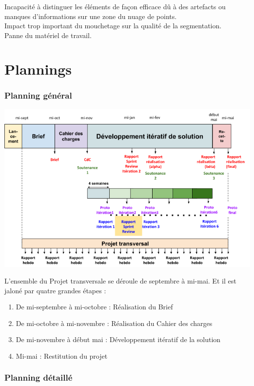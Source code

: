 \documentclass[12pt,titlepage,french]{article}
\begin{document}
Incapacité à distinguer les éléments de façon efficace dû à des artefacts ou manques d'informations sur une zone du nuage de points.\\
Impact trop important du mouchetage sur la qualité de la segmentation.\\
Panne du matériel de travail.

\section{Plannings}
\subsubsection*{Planning général}
\begin{center}
    \includegraphics[width=\textwidth]{planning.png}
    \label{fig:Planning général}
\end{center}
L'ensemble du Projet transversale se déroule de septembre à mi-mai. Et il est jaloné par quatre grandes étapes : 
\begin{enumerate}
    \item De mi-septembre à mi-octobre : Réalisation du Brief
    \item De mi-octobre à mi-novembre : Réalisation du Cahier des charges 
    \item De mi-novembre à début mai : Développement itératif de la solution
    \item Mi-mai : Restitution du projet
\end{enumerate}

\subsubsection*{Planning détaillé}
\end{document}
